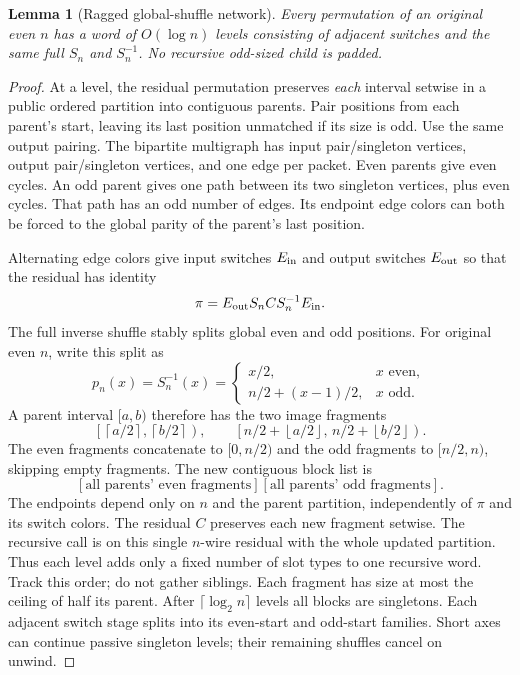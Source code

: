 \documentclass[11pt]{article}
\newtheorem{lemma}[theorem]{Lemma}
\begin{document}
\begin{lemma}[Ragged global-shuffle network]
\label{lem:ragged}
Every permutation of an original even $n$ has a word of $O(\log n)$
levels consisting of adjacent switches and the \emph{same} full $S_n$
and $S_n^{-1}$. No recursive odd-sized child is padded.
\end{lemma}
\begin{proof}
At a level, the residual permutation preserves \emph{each} interval
setwise in a public ordered partition into contiguous parents.
Pair positions from each parent's
start, leaving its last position unmatched if its size is odd.
Use the same output pairing. The bipartite multigraph has input
pair/singleton vertices, output pair/singleton vertices, and one edge
per packet. Even parents give even cycles. An odd parent gives one
path between its two singleton vertices, plus even cycles. That path
has an odd number of edges. Its endpoint edge colors can both be
forced to the global parity of the parent's last position.

Alternating edge colors give input switches $E_{\rm in}$ and output
switches $E_{\rm out}$ so that the residual has identity
\[
 \pi=E_{\rm out}S_n C S_n^{-1}E_{\rm in}.
\]
The full inverse shuffle stably splits global even and odd positions.
For original even $n$, write this split as
\[
 p_n(x)=S_n^{-1}(x)=
 \begin{cases}
 x/2,&x\text{ even},\\
 n/2+(x-1)/2,&x\text{ odd}.
 \end{cases}
\]
A parent interval $[a,b)$ therefore has the two image fragments
\[
 \left[\left\lceil a/2\right\rceil,\left\lceil b/2\right\rceil\right),
 \qquad
 \left[n/2+\left\lfloor a/2\right\rfloor,\,
       n/2+\left\lfloor b/2\right\rfloor\right).
\]
The even fragments concatenate to $[0,n/2)$ and the odd fragments
to $[n/2,n)$, skipping empty fragments.
The new contiguous block list is
\[
 [\text{all parents' even fragments}]
 [\text{all parents' odd fragments}].
\]
The endpoints depend only on $n$ and the parent partition, independently
of $\pi$ and its switch colors. The residual $C$ preserves each new
fragment setwise. The recursive call is on this single $n$-wire
residual with the whole updated partition. Thus each level adds only
a fixed number of slot types to one recursive word.
Track this order; do not gather siblings. Each fragment has size at most
the ceiling of half its parent. After $\lceil\log_2n\rceil$ levels all
blocks are singletons. Each adjacent switch stage splits into its
even-start and odd-start families. Short axes can continue passive
singleton levels; their remaining shuffles cancel on unwind.
\end{proof}
\end{document}
